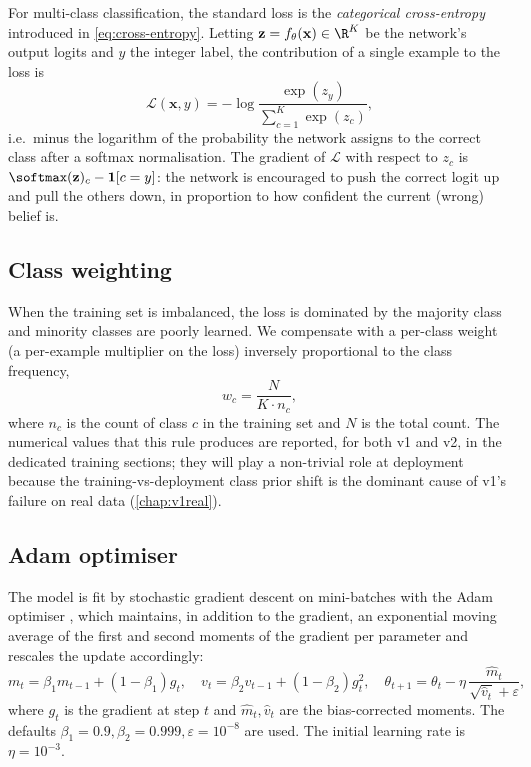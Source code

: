 For multi-class classification, the standard loss is the
\emph{categorical cross-entropy} introduced in \cref{eq:cross-entropy}.
Letting $\mathbf{z} = f_\theta(\mathbf{x}) \in \R^K$ be the network's
output logits and $y$ the integer label, the contribution of a single
example to the loss is
\begin{equation}
    \mathcal{L}(\mathbf{x}, y) = -\log \frac{\exp(z_y)}{\sum_{c=1}^{K} \exp(z_c)},
\end{equation}
i.e.\ minus the logarithm of the probability the network assigns to the
correct class after a softmax normalisation. The gradient of $\mathcal{L}$
with respect to $z_c$ is $\softmax(\mathbf{z})_c - \mathbf{1}[c=y]$:
the network is encouraged to push the correct logit up and pull the
others down, in proportion to how confident the current (wrong) belief
is.

\subsection{Class weighting}
\label{sec:cw-theory}

When the training set is imbalanced, the loss is dominated by the
majority class and minority classes are poorly learned. We compensate
with a per-class weight (a per-example multiplier on the loss)
inversely proportional to the class frequency,
\begin{equation}
    w_c = \frac{N}{K \cdot n_c},
\end{equation}
where $n_c$ is the count of class $c$ in the training set and $N$ is
the total count. The numerical values that this rule produces are
reported, for both v1 and v2, in the dedicated training sections; they
will play a non-trivial role at deployment because the
training-vs-deployment class prior shift is the dominant cause of v1's
failure on real data (\cref{chap:v1real}).

\subsection{Adam optimiser}
\label{sec:adam-theory}

The model is fit by stochastic gradient descent on mini-batches with
the Adam optimiser \cite{kingma2015adam}, which maintains, in addition
to the gradient, an exponential moving average of the first and second
moments of the gradient per parameter and rescales the update
accordingly:
\begin{equation}
    m_t = \beta_1 m_{t-1} + (1 - \beta_1) g_t,
    \quad
    v_t = \beta_2 v_{t-1} + (1 - \beta_2) g_t^2,
    \quad
    \theta_{t+1} = \theta_t - \eta \, \frac{\hat{m}_t}{\sqrt{\hat{v}_t} + \varepsilon},
\end{equation}
where $g_t$ is the gradient at step $t$ and $\hat{m}_t, \hat{v}_t$ are
the bias-corrected moments. The defaults $\beta_1=0.9, \beta_2=0.999,
\varepsilon=10^{-8}$ are used. The initial learning rate is $\eta=10^{-3}$.

